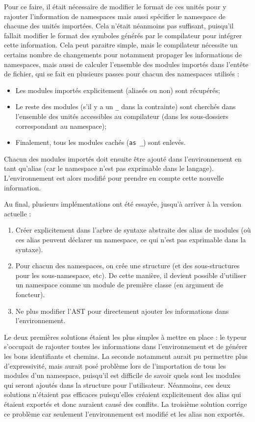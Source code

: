 \documentclass[11pt,a4paper]{report}
\begin{document}
Pour ce faire, il était nécessaire de modifier le format de ces unités pour y
rajouter l'information de namespaces mais aussi spécifier le namespace de
chacune des unités importées. Cela n'était néanmoins pas suffisant, puisqu'il
fallait modifier le format des symboles générés par le compilateur pour intégrer
cette information. Cela peut paraitre simple, mais le compilateur nécessite un
certains nombre de changements pour notamment propager les informations de
namespaces, mais aussi de calculer l'ensemble des modules importés dans l'entête
de fichier, qui se fait en plusieurs passes pour chacun des namespaces utilisés : 
\begin{itemize}
\item Les modules importés explicitement (aliasés ou non) sont récupérés;
\item Le reste des modules (s'il y a un \texttt{\_} dans la contrainte) sont
  cherchés dans l'ensemble des unités accessibles au compilateur (dans les
  sous-dossiers correspondant au namespace);
\item Finalement, tous les modules cachés (\lstinline{as _}) sont enlevés.
\end{itemize}

Chacun des modules importés doit ensuite être ajouté dans l'environnement en
tant qu'alias (car le namespace n'est pas exprimable dans le
langage). L'environnement est alors modifié pour prendre en compte cette
nouvelle information.

Au final, plusieurs implémentations ont été essayée, jusqu'à arriver à la
version actuelle :
\begin{enumerate}
\item Créer explicitement dans l'arbre de syntaxe abstraite des alias de modules
  (où ces alias peuvent déclarer un namespace, ce qui n'est pas exprimable dans
  la syntaxe).
\item Pour chacun des namespaces, on crée une structure (et des sous-structures
  pour les sous-namespace, etc). De cette manière, il devient possible
  d'utiliser un namespace comme un module de première classe (en argument de
  foncteur).
\item Ne plus modifier l'AST pour directement ajouter les informations dans
  l'environnement.
\end{enumerate}
Le deux premières solutions étaient les plus simples à mettre en place : le
typeur s'occupait de rajouter toutes les informations dans l'environnement et de
générer les bons identifiants et chemins. La seconde notamment aurait pu
permettre plus d'expressivité, mais aurait posé problème lors de l'importation
de tous les modules d'un namespace, puisqu'il est difficile de savoir quels sont
les modules qui seront ajoutés dans la structure pour
l'utilisateur. Néanmoins, ces deux solutions n'étaient pas efficaces
puisqu'elles créaient explicitement des alias qui étaient exportés et donc
auraient causé des conflits. La troisième solution corrige ce problème car
seulement l'environnement est modifié et les alias non exportés.
\end{document}
